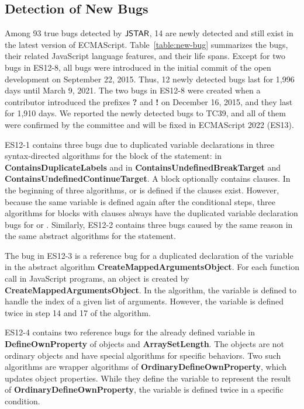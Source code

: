 \subsection{Detection of New Bugs}\label{sec:new-bug}

Among 93 true bugs detected by $\tool$, 14 are newly
detected and still exist in the latest version of ECMAScript.
Table~\ref{table:new-bug} summarizes the bugs, their
related JavaScript language features, and their life spans.
Except for two bugs in ES12-8, all bugs were introduced in the initial
commit of the open development on September 22, 2015.
Thus, 12 newly detected bugs last for 1,996 days until March 9, 2021.
The two bugs in ES12-8 were created when a contributor introduced
the prefixes \textbf{?} and \textbf{!} on December 16, 2015, and they last for 1,910 days.
We reported the newly detected bugs to TC39, and all of them were
confirmed by the committee and will be fixed in ECMAScript 2022 (ES13).

ES12-1 contains three bugs due to duplicated variable declarations
in three syntax-directed algorithms for the  block
of the  statement:
 in \textbf{ContainsDuplicateLabels} and
 in \textbf{ContainsUndefinedBreakTarget} and
\textbf{ContainsUndefinedContinueTarget}.
A  block optionally contains  clauses.
In the beginning of three algorithms,
 or  is defined if the clauses exist.
However, because the same variable is defined again after the conditional steps,
three algorithms for  blocks
with  clauses always have the duplicated variable declaration bugs for
 or .
Similarly, ES12-2 contains three bugs caused by the same reason in the
same abstract algorithms for the  statement.

The bug in ES12-3 is a reference bug for a duplicated declaration of the variable
 in the abstract algorithm \textbf{CreateMappedArgumentsObject}.
For each function call in JavaScript programs, an  object is
created by \textbf{CreateMappedArgumentsObject}.  In the algorithm, the variable
 is defined to handle the index of a given list of arguments.
However, the variable is defined twice in step 14 and 17 of the algorithm.

ES12-4 contains two reference bugs for the already defined variable 
in \textbf{DefineOwnProperty} of  objects and
\textbf{ArraySetLength}.  The  objects are
not ordinary objects and have special algorithms for specific behaviors.
Two such algorithms are wrapper algorithms of
\textbf{OrdinaryDefineOwnProperty}, which updates object properties.
While they define the variable  to represent the result of
\textbf{OrdinaryDefineOwnProperty}, the variable is defined twice in a specific condition.

